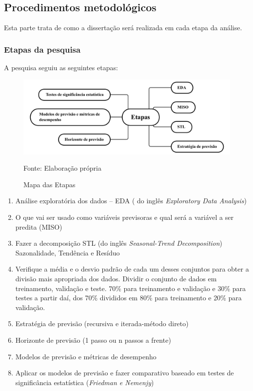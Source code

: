 \subsection{Procedimentos metodol{\'o}gicos} \label{subsec:metod}

Esta parte trata de como a dissertação será realizada em cada etapa da análise.
   
    \subsubsection{Etapas da pesquisa}\label{subsubsec:etp}
    A pesquisa seguiu as seguintes etapas:
    \begin{figure}[H]
    	\centering
    	\caption{Mapa das Etapas}
    	\label{fig:etapas}
    	\includegraphics[width=0.7\linewidth]{Introducao/Figuras/Etapas}
    	
    	Fonte: Elaboração própria
    \end{figure}
    \begin{enumerate}[start=1, label = {\textbf{Etapa} \arabic* } ]
    	\item Análise exploratória dos dados – EDA ( do inglês \textit{Exploratory Data Analysis}) \label{etp:1}
    	\item O que vai ser usado como variáveis previsoras e qual será a variável a ser predita (MISO) \label{etp:2}
    	\item Fazer a decomposição STL (do inglês \textit{Seasonal-Trend Decomposition}) Sazonalidade, Tendência e Resíduo \label{etp:3}
    	\item Verifique a média e o desvio padrão de cada um desses conjuntos para obter a divisão mais apropriada dos dados. Dividir o conjunto de dados em treinamento, validação e teste. 70\% para treinamento e validação e 30\% para testes a partir daí, dos 70\% divididos em 80\% para treinamento e 20\% para validação.\label{etp:4}
    	\item Estratégia de previsão (recursiva e iterada-método direto) \label{etp:5}
    	\item Horizonte de previsão (1 passo ou n passos a frente) \label{etp:6}
    	\item Modelos de previsão e métricas de desempenho \label{etp:7}
    	\item Aplicar os modelos de previsão e fazer comparativo baseado em testes de significância estatística (\textit{Friedman e Nemenjy}) \label{etp:9}
    \end{enumerate}






    